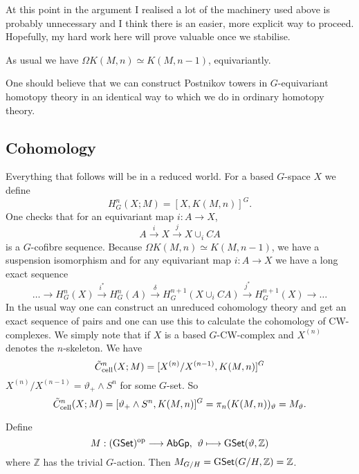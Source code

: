 \documentclass[11pt]{article}
\begin{document}
\begin{FirstNineLectures}
At this point in the argument I realised a lot of the machinery used above is probably unnecessary and I think there is an easier, more explicit way to proceed. Hopefully, my hard work here will prove valuable once we stabilise.

As usual we have $\Omega K(M,n)\simeq K(M,n-1)$, equivariantly.

One should believe that we can construct Postnikov towers in $G$-equivariant homotopy theory in an identical way to which we do in ordinary homotopy theory.







\subsection*{Cohomology}
Everything that follows will be in a reduced world. For a based $G$-space $X$ we define
\[H^n_G(X;M)=[X,K(M,n)]^G.\]
One checks that for an equivariant map $i:A\to X$,
\[A\overset{i}{\to}X\overset{j}{\to}X\cup_i CA\]
is a $G$-cofibre sequence. Because $\Omega K(M,n)\simeq K(M,n-1)$, we have a suspension isomorphism and for any equivariant map $i:A\to X$ we have a long exact sequence
\[\ldots\to H^n_G(X)\overset{i^*}{\to}H^n_G(A)\overset{\delta}{\to}
H^{n+1}_G(X\cup_i CA)\overset{j^*}{\to} H^{n+1}_G(X)\to\ldots\]
In the usual way one can construct an unreduced cohomology theory and get an exact sequence of pairs and one can use this to calculate the cohomology of CW-complexes. We simply note that if $X$ is a based $G$-CW-complex and $X^{(n)}$ denotes the $n$-skeleton. We have
\[\tilde{C}^n_{\textup{cell}}(X;M)=[X^{(n)}/X^{(n-1)},K(M,n)]^G\]
$X^{(n)}/X^{(n-1)}=\vartheta_+\wedge S^n$ for some $G$-set. So
\[\tilde{C}^n_{\textup{cell}}(X;M)=[\vartheta_+\wedge S^n,K(M,n)]^G=\pi_n(K(M,n))_{\vartheta}=M_{\vartheta}.\]
\begin{exmp*}
Define
\[M:(\operatorname{{G\mathsf{Set}}})^{\textup{op}}\longrightarrow\operatorname{{\mathsf{AbGp}}},
\hspace{4pt}
\vartheta\longmapsto \operatorname{{G\mathsf{Set}}}(\vartheta,\mathbb{Z})\]
where $\mathbb{Z}$ has the trivial $G$-action. Then $M_{G/H}=
\operatorname{{G\mathsf{Set}}}(G/H,\mathbb{Z})=\mathbb{Z}$.


\end{exmp*}
\end{FirstNineLectures}
\end{document}
